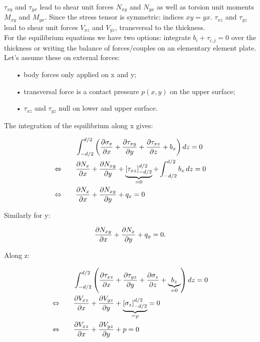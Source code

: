 	$\tau _{xy}$ and $\tau _{yx}$ lead to shear unit forces $N_{xy}$ and $N_{yx}$ as well as torsion unit moments $M_{xy}$ and $M_{yx}$. Since the stress tensor is symmetric: indices $xy = yx$. $\tau _{xz}$ and $\tau _{yz}$ lead to shear unit forces $V_{xz}$ and $V_{yz}$, transversal to the thickness. \\
	
	For the equilibrium equations we have two options: integrate $b_i + \tau _{i,j} = 0$ over the thickness or writing the balance of forces/couples on an elementary element plate. Let's assume these on external forces: 
	
	\begin{itemize}
	\item[•] body forces only applied on x and y;
	\item[•] transversal force is a contact pressure $p(x,y)$ on the upper surface;
	\item[•] $\tau _{xz}$ and $\tau _{yz}$ null on lower and upper surface.\\
	\end{itemize}

	The integration of the equilibrium along x gives: 
	
	\begin{equation}
	\begin{aligned}
	&\int _{-d/2}^{d/2} \left( \frac{\partial \sigma _x}{\partial x} + \frac{\partial \tau _{xy}}{\partial y} + \frac{\partial \tau _{xz}}{\partial z} + b_x\right)dz = 0\\
	\Leftrightarrow\qquad &\frac{\partial N_x}{\partial x} + \frac{\partial N_{xy}}{\partial y} + \underbrace{[\tau _{xz}]_{-d/2}^{d/2}}_{=0} + \int_{-d/2}^{d/2} b_x \, dz = 0\\
	\Leftrightarrow \qquad&\frac{\partial N_x}{\partial x} + \frac{\partial N_{xy}}{\partial y} + q_x = 0 
	\end{aligned}
	\end{equation}
	
	Similarly for y: 
	
	\begin{equation}
	\frac{\partial N_{xy}}{\partial x} + \frac{\partial N_{x}}{\partial y} + q_y = 0.
	\end{equation}
	
	Along z:	
	
	\begin{equation}
	\begin{aligned}
	&\int _{-d/2}^{d/2} \left( \frac{\partial \tau _{xz}}{\partial x} + \frac{\partial \tau _{yz}}{\partial y} + \frac{\partial \sigma _{z}}{\partial z} + \underbrace{b_z}_{=0} \right) dz = 0\\
	\Leftrightarrow\qquad &\frac{\partial V_{xz}}{\partial x} + \frac{\partial V_{yz}}{\partial y} + \underbrace{[\sigma _z]_{-d/2}^{d/2}}_{=p} = 0\\
	\Leftrightarrow \qquad&\frac{\partial V_{xz}}{\partial x} + \frac{\partial V_{yz}}{\partial y} + p = 0 
	\end{aligned}
	\end{equation}
	
